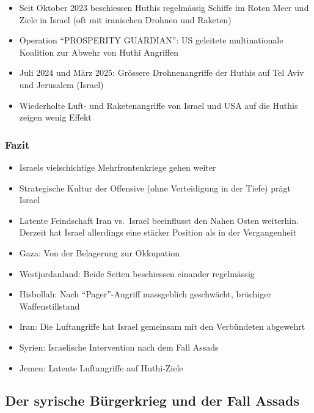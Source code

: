 {}\documentclass[a4paper]{article}
\providecommand{\tightlist}{\setlength{\itemsep}{1mm}\setlength{\parskip}{1mm}}
\begin{document}
\begin{itemize}
	\tightlist
	\item
	      Seit Oktober 2023 beschiessen Huthis regelmässig Schiffe im Roten Meer
	      und Ziele in Israel (oft mit iranischen Drohnen und Raketen)
	\item
	      Operation ``PROSPERITY GUARDIAN'': US geleitete multinationale
	      Koalition zur Abwehr von Huthi Angriffen
	\item
	      Juli 2024 und März 2025: Grössere Drohnenangriffe der Huthis auf Tel
	      Aviv und Jerusalem (Israel)
	\item
	      Wiederholte Luft- und Raketenangriffe von Israel und USA auf die
	      Huthis zeigen wenig Effekt
\end{itemize}

\subsubsection{Fazit}\label{fazit-6}

\begin{itemize}
	\tightlist
	\item
	      Israels vielschichtige Mehrfrontenkriege gehen weiter
	\item
	      Strategische Kultur der Offensive (ohne Verteidigung in der Tiefe)
	      prägt Israel
	\item
	      Latente Feindschaft Iran vs.~Israel beeinflusst den Nahen Osten
	      weiterhin. Derzeit hat Israel allerdings eine stärker Position als in
	      der Vergangenheit
	\item
	      Gaza: Von der Belagerung zur Okkupation
	\item
	      Westjordanland: Beide Seiten beschiessen einander regelmässig
	\item
	      Hisbollah: Nach ``Pager''-Angriff massgeblich geschwächt, brüchiger
	      Waffenstillstand
	\item
	      Iran: Die Luftangriffe hat Israel gemeinsam mit den Verbündeten
	      abgewehrt
	\item
	      Syrien: Israelische Intervention nach dem Fall Assads
	\item
	      Jemen: Latente Luftangriffe auf Huthi-Ziele
\end{itemize}

\subsection{Der syrische Bürgerkrieg und der Fall
	Assads}\label{der-syrische-buxfcrgerkrieg-und-der-fall-assads}
\end{document}
